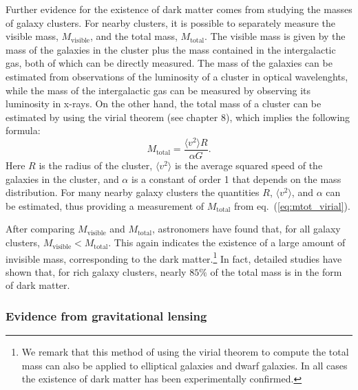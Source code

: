Further evidence for the existence of dark matter comes from studying the masses of galaxy clusters. For nearby clusters, it is possible to separately measure the visible mass, $M_{\mathrm{visible}}$, and the total mass, $M_{\mathrm{total}}$. The visible mass is given by the mass of the galaxies in the cluster plus the mass contained in the intergalactic gas, both of which can be directly measured. The mass of the galaxies can be estimated from observations of the luminosity of a cluster in optical wavelenghts, while the mass of the intergalactic gas can be measured by observing its luminosity in x-rays. On the other hand, the total mass of a cluster can be estimated by using the virial theorem (see chapter 8), which implies the following formula:
\begin{equation} \label{eq:mtot_virial}
M_{\mathrm{total}}=\frac{\langle v^2\rangle R}{\alpha G}.
\end{equation}
Here $R$ is the radius of the cluster, $\langle v^2\rangle$ is the average squared speed of the galaxies in the cluster, and $\alpha$ is a constant of order 1 that depends on the mass distribution. For many nearby galaxy clusters the quantities $R$, $\langle v^2\rangle$, and $\alpha$ can be estimated, thus providing a measurement of $M_{\mathrm{total}}$ from eq.\ (\ref{eq:mtot_virial}).

After comparing $M_{\mathrm{visible}}$ and $M_{\mathrm{total}}$, astronomers have found that, for all galaxy clusters, $M_{\mathrm{visible}}<M_{\mathrm{total}}$. This again indicates the existence of a large amount of invisible mass, corresponding to the dark matter.\footnote{We remark that this method of using the virial theorem to compute the total mass can also be applied to elliptical galaxies and dwarf galaxies. In all cases the existence of dark matter has been experimentally confirmed.} In fact, detailed studies have shown that, for rich galaxy clusters, nearly $85\%$ of the total mass is in the form of dark matter.

\subsubsection{Evidence from gravitational lensing}

